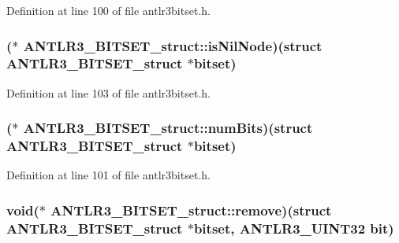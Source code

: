 Definition at line 100 of file antlr3bitset.\-h.

\hypertarget{struct_a_n_t_l_r3___b_i_t_s_e_t__struct_adbe68e4b485b04ab96aca86612ad8582}{
\subsubsection[{is\-Nil\-Node}]{($\ast$ A\-N\-T\-L\-R3\-\_\-\-B\-I\-T\-S\-E\-T\-\_\-struct\-::is\-Nil\-Node)(struct {\bf A\-N\-T\-L\-R3\-\_\-\-B\-I\-T\-S\-E\-T\-\_\-struct} $\ast$bitset)}}\label{struct_a_n_t_l_r3___b_i_t_s_e_t__struct_adbe68e4b485b04ab96aca86612ad8582}


Definition at line 103 of file antlr3bitset.\-h.

\hypertarget{struct_a_n_t_l_r3___b_i_t_s_e_t__struct_ac2391f2f18462a32d3230aa3d4e77749}{
\subsubsection[{num\-Bits}]{($\ast$ A\-N\-T\-L\-R3\-\_\-\-B\-I\-T\-S\-E\-T\-\_\-struct\-::num\-Bits)(struct {\bf A\-N\-T\-L\-R3\-\_\-\-B\-I\-T\-S\-E\-T\-\_\-struct} $\ast$bitset)}}\label{struct_a_n_t_l_r3___b_i_t_s_e_t__struct_ac2391f2f18462a32d3230aa3d4e77749}


Definition at line 101 of file antlr3bitset.\-h.

\hypertarget{struct_a_n_t_l_r3___b_i_t_s_e_t__struct_a2c4b88534ca52e10632aa8b85ac3d951}{
\subsubsection[{remove}]{\setlength{\rightskip}{0pt plus 5cm}void($\ast$ A\-N\-T\-L\-R3\-\_\-\-B\-I\-T\-S\-E\-T\-\_\-struct\-::remove)(struct {\bf A\-N\-T\-L\-R3\-\_\-\-B\-I\-T\-S\-E\-T\-\_\-struct} $\ast$bitset, {\bf A\-N\-T\-L\-R3\-\_\-\-U\-I\-N\-T32} bit)}}\label{struct_a_n_t_l_r3___b_i_t_s_e_t__struct_a2c4b88534ca52e10632aa8b85ac3d951}


